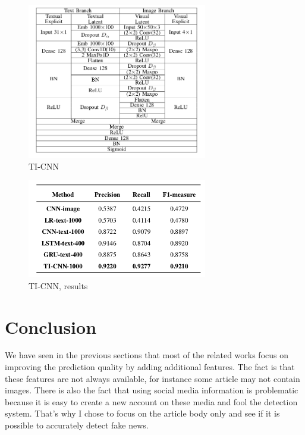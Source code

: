 \begin{figure}[h]
 \centering
 \includegraphics[width=0.7\textwidth]{images/chap1_bis/rev8.png}
 \caption{TI-CNN }
 \label{fig:chap1:yang2}
\end{figure}
\begin{figure}[h]
 \centering
 \includegraphics[width=0.7\textwidth]{images/chap1_bis/rev9.png}
 \caption{TI-CNN, results }
 \label{fig:chap1:yang3}
\end{figure}

\section{Conclusion}
We have seen in the previous sections that most of the related works focus on improving the prediction quality by adding additional features. The fact is that these features are not always available, for instance some article may not contain images. There is also the fact that using social media information is problematic because it is easy to create a new account on these media and fool the detection system. That's why I chose to focus on the article body only and see if it is possible to accurately detect fake news. 
